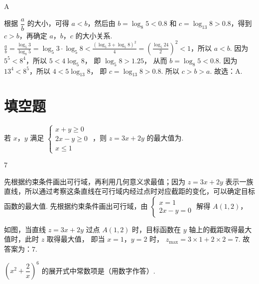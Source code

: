 \begin{answer}
A
\end{answer}

\begin{solution}
根据 \(\dfrac{a}{b}\) 的大小，可得 \(a<b\)，然后由 \(b=\log_8 5<0.8\) 和 \(c=\log_{13} 8>0.8\)，得到 \(c>b\)，再确定 \(a\)，\(b\)，\(c\) 的大小关系.
\(\frac{a}{b}=\frac{\log_5 3}{\log_8 5}=\log_5 3\cdot\log_5 8<\frac{(\log_5 3+\log_5 8)^2}{4}=\left( \frac{\log_5 24}{2} \right)^2<1\)，所以 \(a<b\).
因为 \(5^5<8^4\)，所以
\(5<4\log_5 8\)，
即
\(\log_5 8>1.25\)，
从而
\(b=\log_8 5<0.8\).
因为 \(13^4<8^5\)，所以
\(4<5\log_{13} 8\)，
即
\(c=\log_{13} 8>0.8\).
所以 \(c>b>a\).
故选：A.
\end{solution}
\section{填空题}

\begin{problem}
若 \(x\)，\(y\) 满足 \(\begin{cases}
x+y\ge0\\
2x-y\ge0\\
x\le1
\end{cases}\)
，则 \(z=3x+2y\) 的最大值为\fillinblank{}.
\end{problem}

\begin{answer}
7
\end{answer}

\begin{solution}
先根据约束条件画出可行域，再利用几何意义求最值；因为 \(z=3x+2y\) 表示一族直线，所以通过考察这条直线在可行域内经过点时对应截距的变化，可以确定目标函数的最大值.
先根据约束条件画出可行域，由 \(\begin{cases}
x=1\\
2x-y=0
\end{cases}\)
解得 \(A(1,2)\)，


如图，当直线 \(z=3x+2y\) 过点 \(A(1,2)\) 时，目标函数在 \(y\) 轴上的截距取得最大值时，此时 \(z\) 取得最大值，
即当 \(x=1\)，\(y=2\) 时，
\(z_{\max}=3\times1+2\times2=7\).
故答案为：\(7\).
\end{solution}

\begin{problem}
\(\left( x^2+\dfrac{2}{x} \right)^6\) 的展开式中常数项是\fillinblank{}（用数字作答）.
\end{problem}

